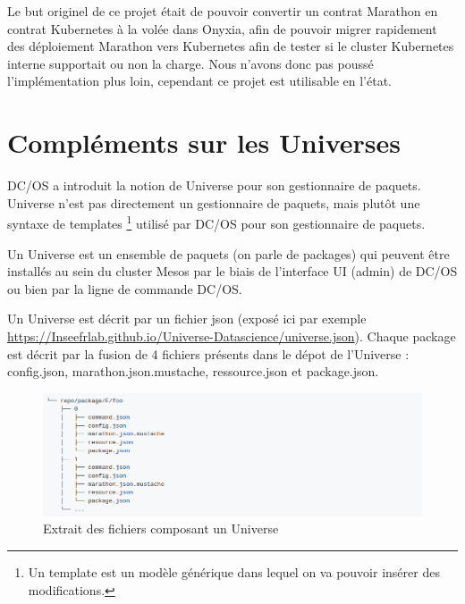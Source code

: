 \documentclass[11pt,fleqn]{book} %
\begin{document}
Le but originel de ce projet était de pouvoir convertir un contrat Marathon en contrat Kubernetes à la volée dans Onyxia, afin de pouvoir migrer rapidement des déploiement Marathon vers Kubernetes afin de tester si le cluster Kubernetes interne supportait ou non la charge. Nous n'avons donc pas poussé l'implémentation plus loin, cependant ce projet est utilisable en l'état.




\chapter{Compléments sur les Universes}
\label{Universe}
\vspace{-2cm}
DC/OS a introduit la notion de Universe pour son gestionnaire de paquets. Universe n'est pas directement un gestionnaire de paquets, mais plutôt une syntaxe de templates \footnote{Un template est un modèle générique dans lequel on va pouvoir insérer des modifications.} utilisé par DC/OS pour son gestionnaire de paquets. \newline

Un Universe est un ensemble de paquets (on parle de packages) qui peuvent être installés au sein du cluster Mesos par le biais de l'interface UI (admin) de DC/OS ou bien par la ligne de commande DC/OS.\newline


Un Universe est décrit par un fichier json (exposé ici par exemple \url{https://Inseefrlab.github.io/Universe-Datascience/universe.json}). Chaque package  est décrit par la fusion de 4 fichiers présents dans le dépot de l'Universe : config.json, marathon.json.mustache, ressource.json et package.json.

\begin{figure}[H]\centering
\renewcommand{\figurename}{Capture d'écran}
\includegraphics[scale=0.5,trim={0 0 20cm 0},clip ]{Pictures/Comparaison/deployer/universe/universe-repo.png}
\captionsetup{margin=1.5cm,format=hang,justification=justified}
\caption[]{Extrait des fichiers composant un Universe \newline}
\end{figure}
\end{document}
